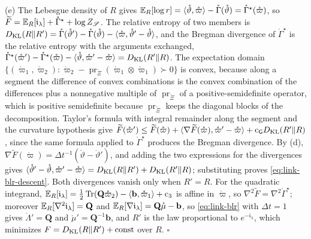 (e) The Lebesgue density of $R$ gives
$\mathbb E_R[\log r]=\langle\mathring\vartheta,\mathring\varpi\rangle-\mathring\Gamma(\mathring\vartheta)=\mathring\Gamma^\star(\mathring\varpi)$,
so $\widetilde F=\mathbb E_R[\mathfrak i_\lambda]+\mathring\Gamma^\star+\log Z_{\mathscr S}$. The relative entropy of
two members is
$D_{\mathrm{KL}}(R\Vert R')=\mathring\Gamma(\mathring\vartheta')-\mathring\Gamma(\mathring\vartheta)-\langle\mathring\varpi,\mathring\vartheta'-\mathring\vartheta\rangle$,
and the Bregman divergence of $\mathring\Gamma^\star$ is the relative entropy with the arguments
exchanged,
$\mathring\Gamma^\star(\mathring\varpi')-\mathring\Gamma^\star(\mathring\varpi)-\langle\mathring\vartheta,\mathring\varpi'-\mathring\varpi\rangle=D_{\mathrm{KL}}(R'\Vert R)$.
The expectation domain $\{(\mathring\varpi_1,\mathring\varpi_2):\mathring\varpi_2-\operatorname{pr}_{\mathring\Xi}(\mathring\varpi_1\otimes\mathring\varpi_1)\succ0\}$
is convex, because along a segment the difference of convex combinations is the convex combination of
the differences plus a nonnegative multiple of $\operatorname{pr}_{\mathring\Xi}$ of a positive-semidefinite
operator, which is positive semidefinite because $\operatorname{pr}_{\mathring\Xi}$ keeps the diagonal
blocks of the decomposition. Taylor's formula with
integral remainder along the segment and the curvature hypothesis give
$\widetilde F(\mathring\varpi')\leq\widetilde F(\mathring\varpi)+\langle\nabla\widetilde F(\mathring\varpi),\mathring\varpi'-\mathring\varpi\rangle+\mathrm c_{\mathsf G}D_{\mathrm{KL}}(R'\Vert R)$,
since the same formula applied to $\mathring\Gamma^\star$ produces the Bregman divergence. By (d),
$\nabla\widetilde F(\mathring\varpi)=\Delta t^{-1}(\mathring\vartheta-\mathring\vartheta')$, and adding the two
expressions for the divergences gives
$\langle\mathring\vartheta'-\mathring\vartheta,\mathring\varpi'-\mathring\varpi\rangle=D_{\mathrm{KL}}(R\Vert R')+D_{\mathrm{KL}}(R'\Vert R)$;
substituting proves \eqref{eq:link-blr-descent}. Both divergences vanish only when $R'=R$. For the
quadratic integrand,
$\mathbb E_R[\mathfrak i_\lambda]=\tfrac12\operatorname{Tr}(\mathbf Q\mathring\varpi_2)-\langle\mathbf b,\mathring\varpi_1\rangle+\mathrm c_3$
is affine in $\mathring\varpi$, so $\nabla^2\widetilde F=\nabla^2\mathring\Gamma^\star$; moreover
$\mathbb E_R[\nabla^2\mathfrak i_\lambda]=\mathbf Q$ and $\mathbb E_R[\nabla\mathfrak i_\lambda]=\mathbf Q\mathring\mu-\mathbf b$, so
\eqref{eq:link-blr} with $\Delta t=1$ gives $\mathring\Lambda'=\mathbf Q$ and
$\mathring\mu'=\mathbf Q^{-1}\mathbf b$, and $R'$ is the law proportional to $e^{-\mathfrak i_\lambda}$, which
minimizes $F=D_{\mathrm{KL}}(R\Vert R')+\mathrm{const}$ over $R$. \hfill$\square$

